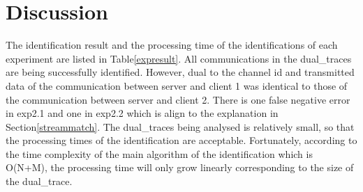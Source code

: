 \section{Discussion}
The identification result and the processing time of the identifications of each experiment are listed in Table\ref{expresult}. All communications in the dual\_traces are being successfully identified. However, dual to the channel id and transmitted data of the communication between server and client 1 was identical to those of the communication  between server and client 2. There is one false negative error in exp2.1 and one in exp2.2 which is align to the explanation in Section\ref{streammatch}. The dual\_traces being analysed is relatively small, so that the processing times of the identification are acceptable. Fortunately, according to the time complexity of the main algorithm of the identification which is O(N+M), the processing time will only grow linearly corresponding to the size of the dual\_trace.

   




